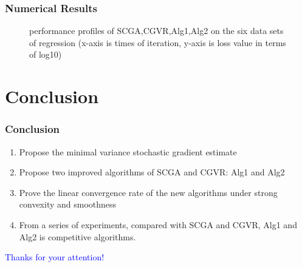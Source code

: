 \documentclass{beamer}
\begin{document}
\begin{frame}
	\frametitle{\bf Numerical Results} 
\begin{figure}
	\begin{center}
	\end{center}
	\caption{performance profiles of SCGA,CGVR,Alg1,Alg2 on the six data sets of regression (x-axis is times of iteration, y-axis is loss value in terms of log10)}
	\label{fig:3}       %
\end{figure}
\end{frame}
\section{Conclusion}
\begin{frame}
	\frametitle{\bf Conclusion} 
			    \begin{enumerate}[(1)]
		\item Propose the minimal variance stochastic gradient estimate \\
	\item Propose two improved algorithms of SCGA and CGVR: Alg1 and Alg2
	\item Prove the linear convergence rate of the new algorithms under strong convexity and smoothness
	\item From a series of experiments, compared with SCGA and CGVR, Alg1 and Alg2 is competitive algorithms.
\end{enumerate}
\end{frame}
\begin{frame}
\vspace{1em}
\vspace{1em}
\vspace{1em}
\vspace{1em}
\vspace{1em}
\vspace{1em}
\vspace{1em}
\vspace{1em}
\vspace{1em}
\vspace{1em}
\centering
\textcolor{blue}{\LARGE Thanks for your attention!}

\end{frame}
\end{document}

